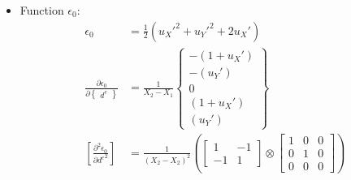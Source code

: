 \documentclass[10pt]{article}
\begin{document}
\begin{itemize}
\item{} Function $\epsilon_0$:
  \begin{align}
    \epsilon_0 &= \frac{1}{2}({u_X'}^2 + {u_Y'}^2 + 2u_X')\nonumber\\
    \frac{\partial
    \epsilon_0}{\partial \begin{Bmatrix}d^e\end{Bmatrix}} &=
                                                            \frac{1}{X_2-X_1} \begin{Bmatrix} 
                                                              -(1+u_X')\\
                                                              -(u_Y')\\
                                                              0\\
                                                              (1+u_X')\\
                                                              (u_Y')\end{Bmatrix}\nonumber\\
    \left[\frac{\partial^2 \epsilon_0}{\partial {d^e}^2}\right] &=
                                                                  \frac{1}{{(X_2-X_2)}^2}
                                                                  \left(\begin{bmatrix}
                                                                      1
                                                                      &
                                                                      -1\\
                                                                      -1
                                                                      &
                                                                      1 \end{bmatrix}
                                                                        \otimes
                                                                        \begin{bmatrix}
                                                                          1&0&0\\
                                                                          0&1&0\\
                                                                          0&0&0
                                                                        \end{bmatrix}\right)

\end{align}
\end{itemize}
\end{document}
